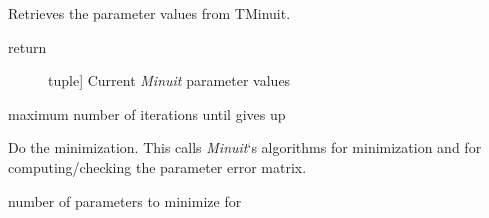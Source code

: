 \documentclass[a4paper,10pt,english]{sphinxmanual}
\begin{document}
\begin{fulllineitems}
\begin{fulllineitems}
\end{fulllineitems}


\begin{fulllineitems}
\label{index:kafe.minuit.Minuit.get_parameter_values}
Retrieves the parameter values from TMinuit.
\begin{description}
\item[{return}] \leavevmode{[}tuple{]}
Current \emph{Minuit} parameter values

\end{description}

\end{fulllineitems}


\begin{fulllineitems}
\label{index:kafe.minuit.Minuit.max_iterations}
maximum number of iterations until  gives up

\end{fulllineitems}


\begin{fulllineitems}
\label{index:kafe.minuit.Minuit.minimize}
Do the minimization. This calls \emph{Minuit}`s algorithms  for minimization
and  for computing/checking the parameter error matrix.

\end{fulllineitems}


\begin{fulllineitems}
\label{index:kafe.minuit.Minuit.number_of_parameters}
number of parameters to minimize for

\end{fulllineitems}


\begin{fulllineitems}
\label{index:kafe.minuit.Minuit.reset}
\end{fulllineitems}


\end{fulllineitems}
\end{document}
